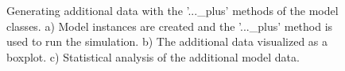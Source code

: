 \documentclass[a4paper,10pt]{article}
\begin{document}
\begin{figure}
\caption{Generating additional data with the '...\_plus' methods of the model classes. a) Model instances are created and the '...\_plus' method is used to run the simulation. b) The additional data visualized
as a boxplot. c) Statistical analysis of the additional model data.}
\label{Fig:ModelPlusMethods}
\end{figure}
\end{document}
